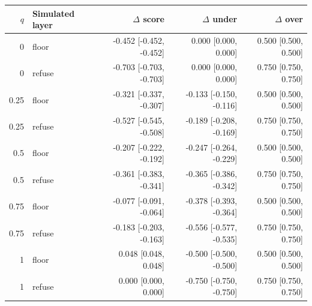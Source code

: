 \begin{tabular}{rlrrr}
\toprule
$q$ & Simulated layer & $\Delta$ score & $\Delta$ under & $\Delta$ over \\
\midrule
0 & floor & -0.452 [-0.452, -0.452] & 0.000 [0.000, 0.000] & 0.500 [0.500, 0.500] \\
0 & refuse & -0.703 [-0.703, -0.703] & 0.000 [0.000, 0.000] & 0.750 [0.750, 0.750] \\
0.25 & floor & -0.321 [-0.337, -0.307] & -0.133 [-0.150, -0.116] & 0.500 [0.500, 0.500] \\
0.25 & refuse & -0.527 [-0.545, -0.508] & -0.189 [-0.208, -0.169] & 0.750 [0.750, 0.750] \\
0.5 & floor & -0.207 [-0.222, -0.192] & -0.247 [-0.264, -0.229] & 0.500 [0.500, 0.500] \\
0.5 & refuse & -0.361 [-0.383, -0.341] & -0.365 [-0.386, -0.342] & 0.750 [0.750, 0.750] \\
0.75 & floor & -0.077 [-0.091, -0.064] & -0.378 [-0.393, -0.364] & 0.500 [0.500, 0.500] \\
0.75 & refuse & -0.183 [-0.203, -0.163] & -0.556 [-0.577, -0.535] & 0.750 [0.750, 0.750] \\
1 & floor & 0.048 [0.048, 0.048] & -0.500 [-0.500, -0.500] & 0.500 [0.500, 0.500] \\
1 & refuse & 0.000 [0.000, 0.000] & -0.750 [-0.750, -0.750] & 0.750 [0.750, 0.750] \\
\bottomrule
\end{tabular}
